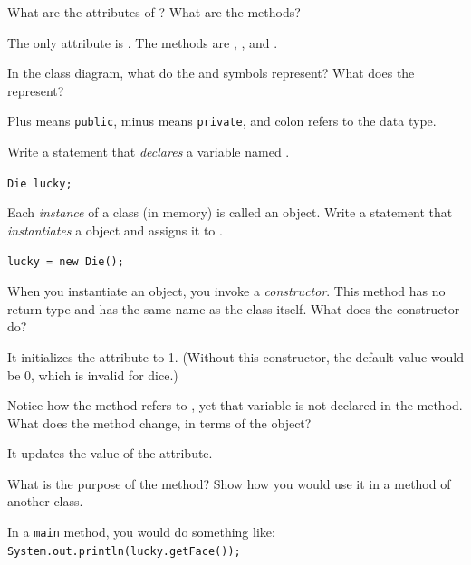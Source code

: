 

\Q What are the attributes of ? What are the methods?

\begin{answer}[3em]
The only attribute is . The methods are , , and .
\end{answer}


\Q In the class diagram, what do the \java{-} and \java{+} symbols represent? What does the \java{:} represent?

\begin{answer}[3em]
Plus means {\tt public}, minus means {\tt private}, and colon refers to the data type.
\end{answer}


\Q \label{dievar}
Write a statement that \emph{declares} a  variable named .

\begin{answer}[3em]
\tt Die lucky;
\end{answer}


\Q Each \emph{instance} of a class (in memory) is called an object. Write a statement that \emph{instantiates} a   object and assigns it to .

\begin{answer}[3em]
\tt lucky = new Die();
\end{answer}


\Q When you instantiate an object, you invoke a \emph{constructor}.
This method has no return type and has the same name as the class itself. What does the  constructor do?

\begin{answer}
It initializes the  attribute to 1.
(Without this constructor, the default value would be 0, which is invalid for dice.)
\end{answer}


\Q Notice how the  method refers to , yet that variable is not declared in the method. What does the  method change, in terms of the  object?

\begin{answer}
It updates the value of the  attribute.
\end{answer}


\Q What is the purpose of the  method? Show how you would use it in a  method of another class.

\begin{answer}
In a {\tt main} method, you would do something like: {\tt System.out.println(lucky.getFace());}
\end{answer}
